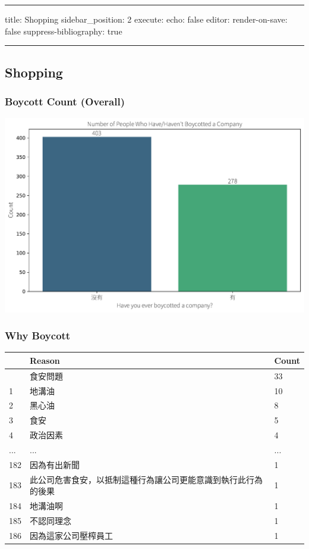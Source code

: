 \documentclass[
  letterpaper,
  DIV=11,
  numbers=noendperiod]{scrartcl}
\begin{document}
\begin{center}\rule{0.5\linewidth}{0.5pt}\end{center}

title: Shopping sidebar\_position: 2 execute: echo: false editor:
render-on-save: false suppress-bibliography: true

\begin{center}\rule{0.5\linewidth}{0.5pt}\end{center}

\subsection{Shopping}\label{shopping-1}

\subsubsection{Boycott Count (Overall)}\label{boycott-count-overall}

\includegraphics{_thesis_files/figure-pdf/cell-6-output-1.pdf}

\subsubsection{Why Boycott}\label{why-boycott}

\begin{longtable}[]{@{}lll@{}}
\toprule\noalign{}
& Reason & Count \\
\midrule\noalign{}
\endhead
\bottomrule\noalign{}
\endlastfoot
0 & 食安問題 & 33 \\
1 & 地溝油 & 10 \\
2 & 黑心油 & 8 \\
3 & 食安 & 5 \\
4 & 政治因素 & 4 \\
... & ... & ... \\
182 & 因為有出新聞 & 1 \\
183 & 此公司危害食安，以抵制這種行為讓公司更能意識到執行此行為的後果 &
1 \\
184 & 地溝油啊 & 1 \\
185 & 不認同理念 & 1 \\
186 & 因為這家公司壓榨員工 & 1 \\
\end{longtable}
\end{document}
